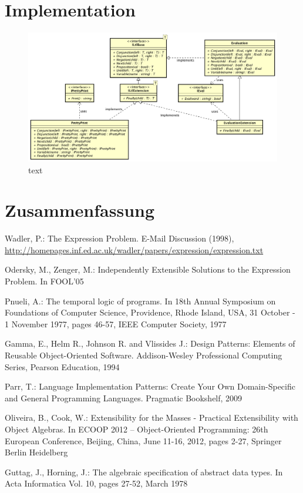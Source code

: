 \documentclass{llncs}
\begin{document}
\section{Implementation} \label{sec:implementation}
\begin{figure}
	\centering
	\includegraphics[width=\textwidth]{images/ObjectAlgebra.png}
	\caption{text}
	\label{fig:object-algebra}
\end{figure}

\section{Zusammenfassung} \label{sec:conclusion}


%
%
\begin{thebibliography}{5}
%

Wadler, P.:
The Expression Problem.
E-Mail Discussion (1998),
\url{http://homepages.inf.ed.ac.uk/wadler/papers/expression/expression.txt}

Odersky, M., Zenger, M.:
Independently Extensible Solutions to the Expression Problem. 
In FOOL'05

Pnueli, A.:
The temporal logic of programs.
In 18th Annual Symposium on Foundations of Computer Science, Providence, Rhode Island, USA, 31 October - 1 November 1977, pages 46-57, IEEE Computer Society, 1977

Gamma, E., Helm R., Johnson R. and Vlissides J.:
Design Patterns: Elements of Reusable Object-Oriented Software.
Addison-Wesley Professional Computing Series, Pearson Education, 1994

Parr, T.:
Language Implementation Patterns: Create Your Own Domain-Specific and General Programming Languages.
Pragmatic Bookshelf, 2009

Oliveira, B., Cook, W.:
Extensibility for the Masses - Practical Extensibility with Object Algebras.
In ECOOP 2012 -- Object-Oriented Programming: 26th European Conference, Beijing, China, June 11-16, 2012, pages 2-27, Springer Berlin Heidelberg

Guttag, J., Horning, J.:
The algebraic specification of abstract data types.
In Acta Informatica Vol. 10, pages 27-52, March 1978

\end{thebibliography}
\end{document}

